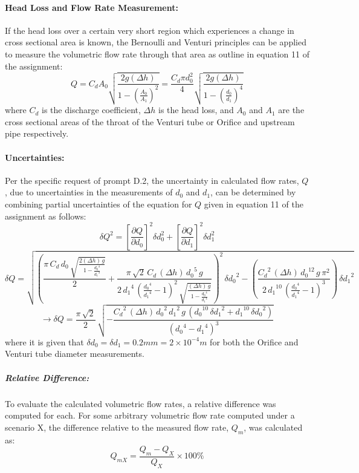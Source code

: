 \documentclass[12pt]{article}
\begin{document}
	\paragraph{Head Loss and Flow Rate Measurement:}
	If the head loss over a certain very short region which experiences a change in cross sectional area is known, the Bernoulli and Venturi principles can be applied to measure the volumetric flow rate through that area as outline in equation 11 of the assignment:
	\begin{equation}
		Q = C_dA_0\sqrt{\frac{2g(\Delta h)}{1-(\frac{A_0}{A_1})^2}} = \frac{C_d\pi d_0^2}{4}\sqrt{\frac{2g(\Delta h)}{1-(\frac{d_0}{d_1})^4}}
	\end{equation}
	where $C_d$ is the discharge coefficient, $\Delta h$ is the head loss, and $A_0$ and $A_1$ are the cross sectional areas of the throat of the Venturi tube or Orifice and upstream pipe respectively.
	\paragraph{Uncertainties:}
	Per the specific request of prompt D.2, the uncertainty in calculated flow rates, $Q$, due to uncertainties in the measurements of $d_0$ and $d_1$, can be determined by combining partial uncertainties of the equation for $Q$ given in equation 11 of the assignment as follows:
	$$\delta Q^2 = \left[\frac{\partial Q}{\partial d_0}\right]^2\delta d_0^2 + \left[\frac{\partial Q}{\partial d_1}\right]^2\delta d_1^2$$
	$$\delta Q = \sqrt{{\left(\frac{\pi \,C_{d}\,d_{0}\,\sqrt{\frac{2(\Delta h)\,g}{1-\frac{{d_{0}}^4}{{d_{1}}^4}}}}{2}+\frac{\pi \,\sqrt{2}\,C_{d}\,(\Delta h)\,{d_{0}}^5\,g}{2\,{d_{1}}^4\,{\left(\frac{{d_{0}}^4}{{d_{1}}^4}-1\right)}^2\,\sqrt{\frac{(\Delta h)\,g}{1-\frac{{d_{0}}^4}{{d_{1}}^4}}}}\right)}^2\,{\delta d_{0}}^2-\left(\frac{{C_{d}}^2\,(\Delta h)\,{d_{0}}^{12}\,g\,\pi ^2}{2\,{d_{1}}^{10}\,{\left(\frac{{d_{0}}^4}{{d_{1}}^4}-1\right)}^3}\right)\,{\delta d_{1}}^2}$$
	\begin{equation}
		\rightarrow \delta Q = \frac{\pi \,\sqrt{2}}{2}\,\sqrt{-\frac{{C_{d}}^2\,(\Delta h)\,{d_{0}}^2\,{d_{1}}^2\,g\,\left({d_{0}}^{10}\,{\delta d_{1}}^2+{d_{1}}^{10}\,{\delta d_{0}}^2\right)}{{\left({d_{0}}^4-{d_{1}}^4\right)}^3}}
	\end{equation}
	where it is given that $\delta d_0=\delta d_1=0.2mm=2\times10^{-4}m$ for both the Orifice and Venturi tube diameter measurements.
	\subparagraph{Relative Difference:}
	To evaluate the calculated volumetric flow rates, a relative difference was computed for each. For some arbitrary volumetric flow rate computed under a scenario X, the difference relative to the measured flow rate, $Q_m$, was calculated as:
	\begin{equation}
		Q_{mX}=\frac{Q_m - Q_X}{Q_X}\times100\%
	\end{equation}
	
\end{document}
